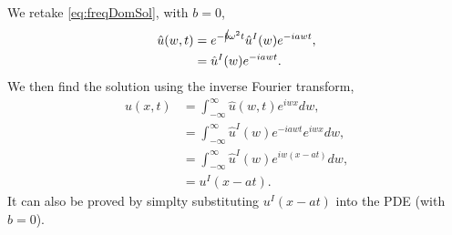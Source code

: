\begin{questions}
\begin{solution}
We retake \eqref{eq:freqDomSol}, with $b=0$,
\begin{align*}
\hat{u}(w,t)&=e^{-\cancel{b}\omega^2t}\hat{u}^I(w)e^{-iawt},\\
&=\hat{u}^I(w)e^{-iawt}.
\end{align*}
We then find the solution using the inverse Fourier transform,
\begin{align*}
u(x,t) &= \int_{-\infty}^{\infty}\hat{u}(w,t)e^{iwx}dw,\\
&= \int_{-\infty}^{\infty}\hat{u}^I(w)e^{-iawt}e^{iwx}dw,\\
&= \int_{-\infty}^{\infty}\hat{u}^I(w)e^{iw(x-at)}dw,\\
&= u^I(x-at).
\end{align*}
It can also be proved by simplty substituting $u^I(x-at)$ into the PDE (with $b=0$).


\end{solution}
\end{questions}

